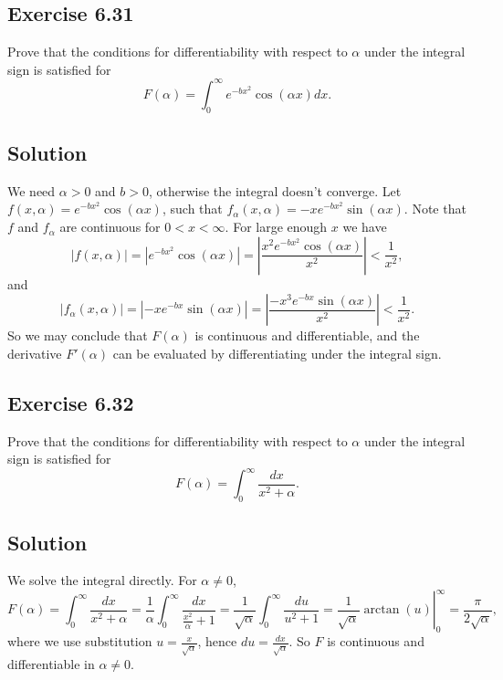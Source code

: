 \subsection*{Exercise 6.31}

Prove that the conditions for differentiability with respect to $\alpha$ under the integral sign is satisfied for
\begin{equation*}
    F(\alpha) = \int_{0}^{\infty} e^{-bx^2} \cos(\alpha x) dx.
\end{equation*}

\subsection*{Solution}

We need $\alpha > 0$ and $b > 0$, otherwise the integral doesn't converge.
Let $f(x, \alpha) = e^{-bx^2} \cos(\alpha x)$, such that $f_{\alpha}(x, \alpha) = -x e^{-bx^2} \sin(\alpha x)$.
Note that $f$ and $f_{\alpha}$ are continuous for $0 < x < \infty$.
For large enough $x$ we have
\begin{equation*}
    |f(x, \alpha)| = |e^{-b x^2} \cos(\alpha x)| = \left| \frac{x^2 e^{-b x^2} \cos(\alpha x)}{x^2} \right| < \frac{1}{x^2},
\end{equation*}
and
\begin{equation*}
    |f_{\alpha}(x, \alpha)| = |-x e^{-b x} \sin(\alpha x)| = \left| \frac{-x^3 e^{-b x} \sin(\alpha x)}{x^2} \right| < \frac{1}{x^2}.
\end{equation*}
So we may conclude that $F(\alpha)$ is continuous and differentiable, and the derivative $F'(\alpha)$ can be evaluated by differentiating under the integral sign.


\subsection*{Exercise 6.32}

Prove that the conditions for differentiability with respect to $\alpha$ under the integral sign is satisfied for
\begin{equation*}
    F(\alpha) = \int_{0}^{\infty} \frac{dx}{x^2 + \alpha}.
\end{equation*}

\subsection*{Solution}

We solve the integral directly.
For $\alpha \neq 0$,
\begin{equation*}
    F(\alpha) = \int_0^{\infty} \frac{dx}{x^2 + \alpha}
        = \frac{1}{\alpha} \int_0^{\infty} \frac{dx}{\frac{x^2}{\alpha} + 1}
        = \frac{1}{\sqrt{\alpha}} \int_0^{\infty} \frac{du}{u^2 + 1}
        = \left. \frac{1}{\sqrt{\alpha}} \arctan(u) \right|_0^{\infty}
        = \frac{\pi}{2 \sqrt{\alpha}},
\end{equation*}
where we use substitution $u = \frac{x}{\sqrt{\alpha}}$, hence $du = \frac{dx}{\sqrt{\alpha}}$.
So $F$ is continuous and differentiable in $\alpha \neq 0$.


